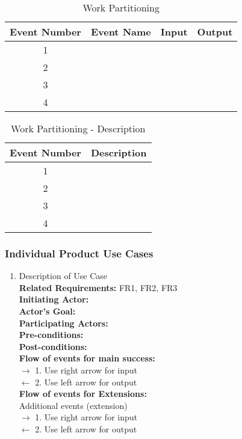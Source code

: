 \documentclass[12pt, titlepage]{article}
\begin{document}
\begin{table}[H]
	\centering
	\caption{Work Partitioning}
	\label{my-label}
	\begin{tabular}{|c|c|c|c|}
		\hline
		\textbf{Event Number} & \textbf{Event Name} & \textbf{Input} & \textbf{Output}     \\ \hline
		1 &  &  &  \\ \hline
		2 &  &  &  \\ \hline
		3 &  &  &  \\ \hline
		4 &  &  &  \\ \hline
	\end{tabular}
\end{table}

\begin{table}[H]
	\centering
	\caption{Work Partitioning - Description}
	\label{my-label}
	\begin{tabular}{|c|c|}
		\hline
		\textbf{Event Number} & \textbf{Description}											\\ \hline
		1 & 	\\ \hline
		2 & 	\\ \hline
		3 &   \\ \hline
		4 &   \\ \hline
	\end{tabular}
\end{table}


\subsubsection{Individual Product Use Cases}

\begin{enumerate}[{UC-}1:]
    
\item Description of Use Case\\
    \textbf{Related Requirements:} FR1, FR2, FR3\\ %
    \textbf{Initiating Actor:} \\
    \textbf{Actor's Goal:} \\
    \textbf{Participating Actors:} \\
    \textbf{Pre-conditions:}\\
    \textbf{Post-conditions:}\\
    \textbf{Flow of events for main success:}\\
    $\rightarrow$ 1. Use right arrow for input\\
    $\leftarrow$ 2. Use left arrow for output\\
    \textbf{Flow of events for Extensions:}\\
    Additional events (extension) \\
    $\rightarrow$ 1. Use right arrow for input\\
    $\leftarrow$ 2. Use left arrow for output\\
    
\color{black}
\end{enumerate}
\end{document}
